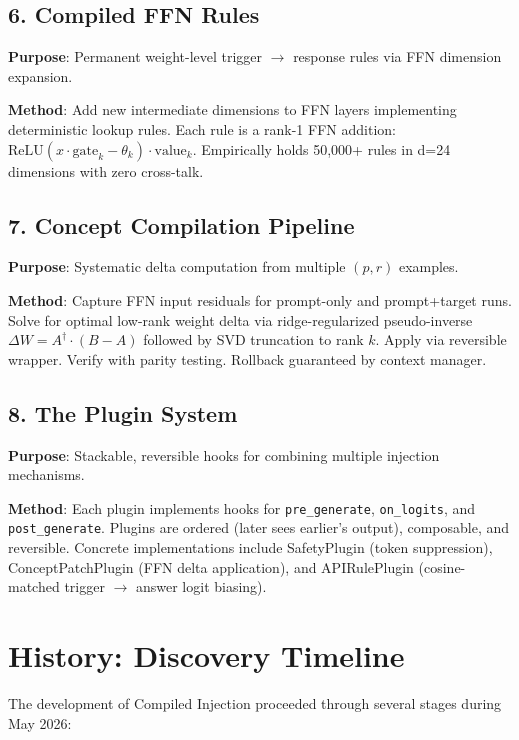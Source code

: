\documentclass[11pt,a4paper]{article}
\begin{document}
\subsection{6. Compiled FFN Rules}

\textbf{Purpose}: Permanent weight-level trigger $\rightarrow$ response rules via FFN dimension expansion.

\textbf{Method}: Add new intermediate dimensions to FFN layers implementing deterministic lookup rules. Each rule is a rank-1 FFN addition: $\text{ReLU}(x \cdot \text{gate}_k - \theta_k) \cdot \text{value}_k$. Empirically holds 50,000+ rules in d=24 dimensions with zero cross-talk.

\subsection{7. Concept Compilation Pipeline}

\textbf{Purpose}: Systematic delta computation from multiple $(p, r)$ examples.

\textbf{Method}: Capture FFN input residuals for prompt-only and prompt+target runs. Solve for optimal low-rank weight delta via ridge-regularized pseudo-inverse $\Delta W = A^{\dagger} \cdot (B - A)$ followed by SVD truncation to rank $k$. Apply via reversible wrapper. Verify with parity testing. Rollback guaranteed by context manager.

\subsection{8. The Plugin System}

\textbf{Purpose}: Stackable, reversible hooks for combining multiple injection mechanisms.

\textbf{Method}: Each plugin implements hooks for \texttt{pre\_generate}, \texttt{on\_logits}, and \texttt{post\_generate}. Plugins are ordered (later sees earlier's output), composable, and reversible. Concrete implementations include SafetyPlugin (token suppression), ConceptPatchPlugin (FFN delta application), and APIRulePlugin (cosine-matched trigger $\rightarrow$ answer logit biasing).

\section{History: Discovery Timeline}

The development of Compiled Injection proceeded through several stages during May 2026:
\end{document}
